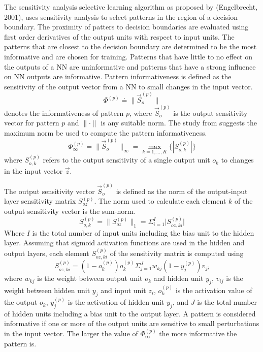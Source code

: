 \documentclass[conference]{IEEEtran}
\begin{document}
	The sensitivity analysis selective learning algorithm as proposed by (Engelbrecht, 2001), uses sensitivity analysis to select patterns in the region of a decision boundary. The proximity of patters to decision boundaries are evaluated using first order derivatives of the output units with respect to input units. The patterns that are closest to the decision boundary are determined to be the most informative and are chosen for training. Patterns that have little to no effect on the outputs of a NN are uninformative and patterns that have a strong influence on NN outputs are informative. Pattern informativeness is defined as the sensitivity of the output vector from a NN to small changes in the input vector. 
	$$
	\Phi^{(p)} \doteq \lVert\vec{S}_o^{(p)}\lVert
	$$
	denotes the informativeness of pattern $p$, where $\vec{S}_o^{(p)}$ is the output sensitivity vector for pattern $p$ and $\lVert\cdot\lVert$ is any suitable norm. 
	The study from \cite{engelbrecht2001} suggests the maximum norm be used to compute the pattern informativeness.
	$$
	\Phi_\infty^{(p)} = \lVert\vec{S}_o^{(p)}\lVert_\infty = \max_{k=1,...,K}\{|S_{o,k}^{(p)}|\}
	$$
	where $S_{o,k}^{(p)}$ refers to the output sensitivity of a single output unit $o_k$ to changes in the input vector $\vec{z}$.
	
	The output sensitivity vector $\vec{S}_o^{(p)}$ is defined as the norm of the output-input layer sensitivity matrix $S_{oz}^{(p)}$. The norm used to calculate each element $k$ of the output sensitivity vector is the sum-norm.
	$$
	S_{o,k}^{(p)}=\lVert S_{oz}^{(p)}\lVert_1 = \Sigma_{i=1}^I \lvert S_{oz,ki}^{(p)}\lvert
	$$
	Where $I$ is the total number of input units including the bias unit to the hidden layer.
	Assuming that sigmoid activation functions are used in the hidden and output layers, each element $S_{oz,ki}^{(p)}$ of the sensitivity matrix is computed using
	$$
	S_{oz,ki}^{(p)}=(1-o_k^{(p)})o_k^{(p)}\Sigma_{j=1}^Jw_{kj}(1-y_j^{(p)})v_{ji}
	$$
	where $w_{kj}$ is the weight between output unit $o_k$ and hidden unit $y_j$, $v_{ij}$ is the weight between hidden unit $y_j$ and input unit $z_{i}$, $o_k^{(p)}$ is the activation value of the output $o_k$, $y_j^{(p)}$ is the activation of hidden unit $y_j$, and $J$ is the total number of hidden units including a bias unit to the output layer.
	A pattern is considered informative if one or more of the output units are sensitive to small perturbations in the input vector. The larger the value of $\Phi_\infty^{(p)}$ the more informative the pattern is.
	
\end{document}
